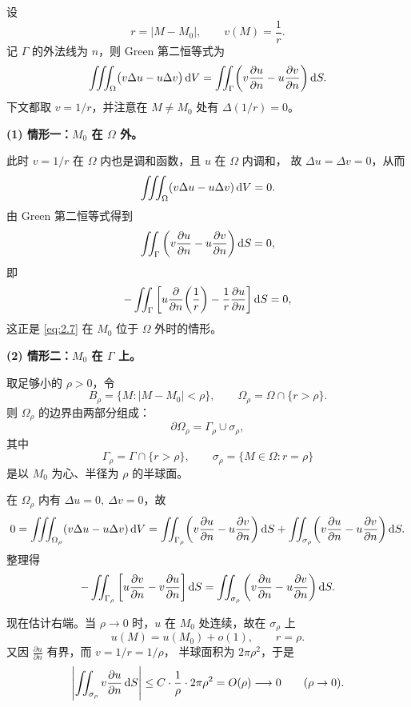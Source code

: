 \begin{solution}
设
\[
r = |M-M_0|,\qquad v(M)=\frac{1}{r}.
\]
记 $\Gamma$ 的外法线为 $n$，则 Green 第二恒等式为
\[
\iiint_{\Omega} \bigl(v\Delta u-u\Delta v\bigr)\,{\rm d}V
  =\iint_{\Gamma}\!\left(
      v\frac{\partial u}{\partial n}
      -u\frac{\partial v}{\partial n}
    \right){\rm d}S .
\]
下文都取 $v=1/r$，并注意在 $M\neq M_0$ 处有 $\Delta(1/r)=0$。

\medskip
\noindent\textbf{(1) 情形一：$M_0$ 在 $\Omega$ 外。}

此时 $v=1/r$ 在 $\Omega$ 内也是调和函数，且 $u$ 在 $\Omega$ 内调和，
故 $\Delta u=\Delta v=0$，从而
\[
\iiint_{\Omega} (v\Delta u-u\Delta v)\,{\rm d}V=0.
\]
由 Green 第二恒等式得到
\[
\iint_{\Gamma}
\left(
  v\frac{\partial u}{\partial n}
  -u\frac{\partial v}{\partial n}
\right){\rm d}S=0,
\]
即
\[
-\iint_{\Gamma}
\left[
  u\frac{\partial}{\partial n}\!\left(\frac{1}{r}\right)
  -\frac{1}{r}\frac{\partial u}{\partial n}
\right]{\rm d}S=0,
\]
这正是 \eqref{eq:2.7} 在 $M_0$ 位于 $\Omega$ 外时的情形。

\medskip
\noindent\textbf{(2) 情形二：$M_0$ 在 $\Gamma$ 上。}

取足够小的 $\rho>0$，令
\[
B_\rho=\{M:|M-M_0|<\rho\},\qquad
\Omega_\rho=\Omega\cap\{r>\rho\}.
\]
则 $\Omega_\rho$ 的边界由两部分组成：
\[
\partial\Omega_\rho=\Gamma_\rho\cup\sigma_\rho,
\]
其中
\[
\Gamma_\rho=\Gamma\cap\{r>\rho\},\qquad
\sigma_\rho=\{M\in\Omega:r=\rho\}
\]
是以 $M_0$ 为心、半径为 $\rho$ 的半球面。

在 $\Omega_\rho$ 内有 $\Delta u=0,\ \Delta v=0$，故
\[
0=\iiint_{\Omega_\rho} (v\Delta u-u\Delta v)\,{\rm d}V
 =\iint_{\Gamma_\rho}\!\left(
     v\frac{\partial u}{\partial n}
     -u\frac{\partial v}{\partial n}
   \right){\rm d}S
 +\iint_{\sigma_\rho}\!\left(
     v\frac{\partial u}{\partial n}
     -u\frac{\partial v}{\partial n}
   \right){\rm d}S .
\]
整理得
\begin{equation}\label{eq:srho}
 -\iint_{\Gamma_\rho}
 \left[
   u\frac{\partial v}{\partial n}
   -v\frac{\partial u}{\partial n}
 \right]{\rm d}S
 =\iint_{\sigma_\rho}
 \left(
   v\frac{\partial u}{\partial n}
   -u\frac{\partial v}{\partial n}
 \right){\rm d}S .
\end{equation}

现在估计右端。当 $\rho\to0$ 时，$u$ 在 $M_0$ 处连续，故在 $\sigma_\rho$ 上
\[
u(M)=u(M_0)+o(1),\qquad r=\rho.
\]
又因 $\frac{\partial u}{\partial n}$ 有界，而 $v=1/r=1/\rho$，
半球面积为 $2\pi\rho^2$，于是
\[
\left|
\iint_{\sigma_\rho} v\frac{\partial u}{\partial n}\,{\rm d}S
\right|
\le C\cdot\frac{1}{\rho}\cdot 2\pi\rho^2
=O(\rho)\longrightarrow 0\qquad(\rho\to0).
\]


\end{solution}
